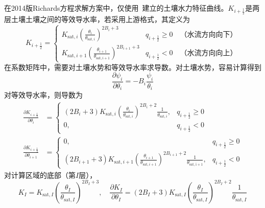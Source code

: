 在2014版Richards方程求解方案中，仅使用~\citet{campbell1974}建立的土壤水力特征曲线。$K_{i+\frac{1}{2}}$是两层土壤土壤之间的等效导水率，若采用上游格式，其定义为
\begin{equation}
  K_{i+\frac{1}{2}}=
  \begin{cases}
    K_{\mathrm{sat},i}\left(\frac{\theta_{i}}{\theta_{\mathrm{sat},i}}\right)^{2 B_i+3}
    & q_{i+\frac{1}{2}} \geqslant 0 \quad \mbox{（水流方向向下）}\\
    K_{\mathrm{sat},i +1}\left(\frac{\theta_{i+1}}{\theta_{\mathrm{sat},i +1}}\right)^{2 B_{i+1}+3}
    & q_{i+\frac{1}{2}} < 0 \quad \mbox{（水流方向向上）}
  \end{cases}
\end{equation}
在系数矩阵中，需要对土壤水势和等效导水率求导数。对土壤水势，容易计算得到
\begin{equation}
  \frac{\partial \psi_{i}}{\partial \theta_{i}}=-B_i \frac{\psi_{i}}{\theta_{i}}
\end{equation}
对等效导水率，则导数为
\begin{align}
  \frac{\partial K_{i+\frac{1}{2}}}{\partial \theta_{i}} & =
  \begin{cases}
    \left(2B_i+3\right) K_{\mathrm{sat},i}\left(\frac{\theta_{i}}{\theta_{\mathrm{sat},i}}\right)^{2B_i+2}
    \frac{1}{\theta_{\mathrm{sat},i}}, & q_{i+\frac{1}{2}} \geqslant 0 \\
    0, & q_{i+\frac{1}{2}} < 0
  \end{cases}
  \\
  \frac{\partial K_{i+\frac{1}{2}}}{\partial \theta_{i+1}} & =
  \begin{cases}
    0, & q_{i+\frac{1}{2}} \geqslant 0 \\
    (2B_{i+1}+3) K_{\mathrm{sat},i +1}\left(\frac{\theta_{i+1}}{\theta_{\mathrm{sat},i +1}}\right)^{2B_{i+1}+2} \frac{1}{\theta_{\mathrm{ {sat},i +1}}}, & q_{i+\frac{1}{2}} < 0
  \end{cases}
\end{align}
对计算区域的底部（第$I$层），
\begin{equation}
  K_{I}=K_{\mathrm{sat},I}\left(\frac{\theta_{I}}{\theta_{\mathrm{sat},I}}\right)^{2B_I+3}, \quad \frac{\partial K_{I}}
  {\partial \theta_{I}} = (2B_I+3) K_{\mathrm{sat},I}\left(\frac{\theta_{I}}{\theta_{\mathrm{sat},I}}\right)^{2B_I+2} \frac{1}{\theta_{\mathrm{sat},I}}
\end{equation}

